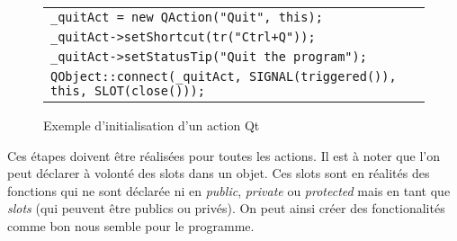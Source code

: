 \begin{figure}[ht]
   \begin{center}
      \begin{tabular}{l}
         \hline
         \verb|_quitAct = new QAction("Quit", this);|\\
         \verb|_quitAct->setShortcut(tr("Ctrl+Q"));|\\
         \verb|_quitAct->setStatusTip("Quit the program");|\\
         \verb|QObject::connect(_quitAct, SIGNAL(triggered()), this, SLOT(close()));|\\
         \hline
      \end{tabular}
   \end{center}
\caption{\label{exemple_initAction_qt} Exemple d'initialisation d'un action Qt}
\end{figure}

Ces \'etapes doivent \^etre r\'ealis\'ees pour toutes les actions. Il est \`a noter que l'on peut d\'eclarer \`a volont\'e des slots dans un objet. Ces slots sont en r\'ealit\'es des fonctions qui ne sont d\'eclar\'ee ni en \textit{public}, \textit{private} ou \textit{protected} mais en tant que \textit{slots} (qui peuvent \^etre publics ou priv\'es). On peut ainsi cr\'eer des fonctionalit\'es comme bon nous semble pour le programme.